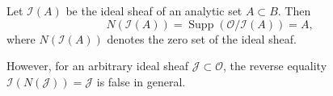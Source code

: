 Let $\mathcal{I}(A)$ be the ideal sheaf of an analytic set $A \subset B$. Then
$$
N(\mathcal{I}(A)) = \operatorname{Supp}(\mathcal{O}/\mathcal{I}(A)) = A,
$$
where $N(\mathcal{I}(A))$ denotes the zero set of the ideal sheaf.

However, for an arbitrary ideal sheaf $\mathcal{J} \subset \mathcal{O}$, the reverse equality $\mathcal{I}(N(\mathcal{J})) = \mathcal{J}$ is false in general.
